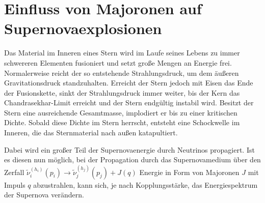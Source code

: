 \section{Einfluss von Majoronen auf Supernovaexplosionen} %

Das Material im Inneren eines Stern wird im Laufe seines Lebens zu immer schwereren Elementen fusioniert und setzt große Mengen an Energie frei.
Normalerweise reicht der so entstehende Strahlungsdruck, um dem äußeren Gravitationsdruck standzuhalten.
Erreicht der Stern jedoch mit Eisen das Ende der Fusionskette, sinkt der Strahlungsdruck immer weiter, bis der Kern das Chandrasekhar-Limit erreicht und der Stern endgültig instabil wird.
Besitzt der Stern eine ausreichende Gesamtmasse, implodiert er bis zu einer kritischen Dichte.
Sobald diese Dichte im Stern herrscht, entsteht eine Schockwelle im Inneren, die das Sternmaterial nach außen katapultiert.

Dabei wird ein großer Teil der Supernovaenergie durch Neutrinos propagiert.
Ist es diesen nun möglich, bei der Propagation durch das Supernovamedium über den Zerfall $\tilde{\nu}^{(h_i)}_i (p_i) \rightarrow \tilde{\nu}^{(h_j)}_j (p_j) + J(q)$ Energie in Form von Majoronen $J$ mit Impuls $q$ abzustrahlen,
kann sich, je nach Kopplungsstärke, das Energiespektrum der Supernova verändern.

